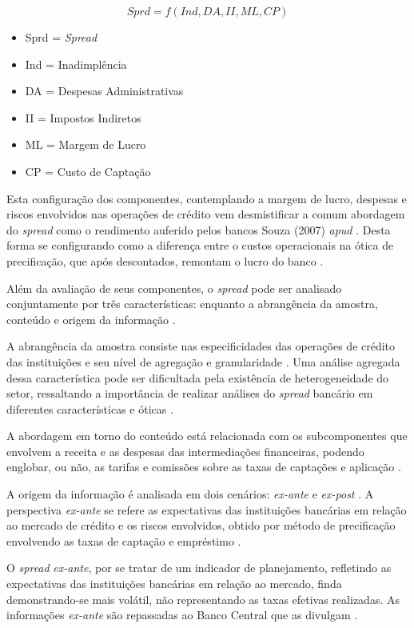 \documentclass[12pt,openright,oneside,a4paper,chapter=TITLE,section=TITLE,subsection=Title,english,french,spanish,portugues,sumario=tradicional]{04-class-files/abntex2}
\providecommand{\tightlist}{%
  \setlength{\itemsep}{0pt}\setlength{\parskip}{0pt}}
\begin{document}
\[
Sprd=f(Ind, DA, II, ML, CP)
\]

\begin{itemize}
\tightlist
\item
  Sprd = \emph{Spread}
\item
  Ind = Inadimplência
\item
  DA = Despesas Administrativas
\item
  II = Impostos Indiretos
\item
  ML = Margem de Lucro
\item
  CP = Custo de Captação
\end{itemize}

Esta configuração dos componentes, contemplando a margem de lucro, despesas e
riscos envolvidos nas operações de crédito vem desmistificar a comum abordagem
do \emph{spread} como o rendimento auferido pelos bancos \cite{costa;nakane:2004}
Souza (2007) \emph{apud} \cite{dantas:2012}. Desta forma se configurando como a
diferença entre o custos operacionais na ótica de precificação, que após
descontados, remontam o lucro do banco \cite{BCB:2016}.

Além da avaliação de seus componentes, o \emph{spread} pode ser analisado
conjuntamente por três características: enquanto a abrangência da amostra,
conteúdo e origem da informação \cite{leal:2006}.

A abrangência da amostra consiste nas especificidades das operações de crédito
das instituições e seu nível de agregação e granularidade
\cite{costa;nakane:2004}. Uma análise agregada dessa característica pode ser
dificultada pela existência de heterogeneidade do setor, ressaltando a
importância de realizar análises do \emph{spread} bancário em diferentes
características e óticas \cite{block:2000}.

A abordagem em torno do conteúdo está relacionada com os subcomponentes que
envolvem a receita e as despesas das intermediações financeiras, podendo
englobar, ou não, as tarifas e comissões sobre as taxas de captações e
aplicação \cite{block:2000}.

A origem da informação é analisada em dois cenários: \emph{ex-ante} e \emph{ex-post}
\cite{kunt:1999, levine:1997}. A perspectiva \emph{ex-ante} se refere as
expectativas das instituições bancárias em relação ao mercado de crédito e os
riscos envolvidos, obtido por método de precificação envolvendo as taxas de
captação e empréstimo \cite{durigan:2018, leal:2006, dantas:2012}.

O \emph{spread} \emph{ex-ante}, por se tratar de um indicador de planejamento, refletindo
as expectativas das instituições bancárias em relação ao mercado, finda
demonstrando-se mais volátil, não representando as taxas efetivas realizadas.
As informações \emph{ex-ante} são repassadas ao Banco Central que as divulgam
\cite{durigan:2018, leal:2006, dantas:2012}.
\end{document}

